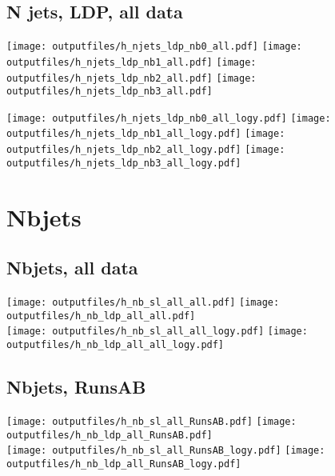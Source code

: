 \documentclass[11pt]{article}
\begin{document}
   \clearpage

    \subsection{ N jets, LDP, all data}

    \noindent
     \texttt{[image: outputfiles/h\_njets\_ldp\_nb0\_all.pdf]}
     \texttt{[image: outputfiles/h\_njets\_ldp\_nb1\_all.pdf]}
     \texttt{[image: outputfiles/h\_njets\_ldp\_nb2\_all.pdf]}
     \texttt{[image: outputfiles/h\_njets\_ldp\_nb3\_all.pdf]}

    \noindent
     \texttt{[image: outputfiles/h\_njets\_ldp\_nb0\_all\_logy.pdf]}
     \texttt{[image: outputfiles/h\_njets\_ldp\_nb1\_all\_logy.pdf]}
     \texttt{[image: outputfiles/h\_njets\_ldp\_nb2\_all\_logy.pdf]}
     \texttt{[image: outputfiles/h\_njets\_ldp\_nb3\_all\_logy.pdf]}

   \clearpage




    \clearpage
    \section{Nbjets}

    \subsection{ Nbjets, all data}

    \noindent
     \texttt{[image: outputfiles/h\_nb\_sl\_all\_all.pdf]}
     \texttt{[image: outputfiles/h\_nb\_ldp\_all\_all.pdf]} \\
     \texttt{[image: outputfiles/h\_nb\_sl\_all\_all\_logy.pdf]}
     \texttt{[image: outputfiles/h\_nb\_ldp\_all\_all\_logy.pdf]}


    \subsection{ Nbjets, RunsAB}

    \noindent
     \texttt{[image: outputfiles/h\_nb\_sl\_all\_RunsAB.pdf]}
     \texttt{[image: outputfiles/h\_nb\_ldp\_all\_RunsAB.pdf]} \\
     \texttt{[image: outputfiles/h\_nb\_sl\_all\_RunsAB\_logy.pdf]}
     \texttt{[image: outputfiles/h\_nb\_ldp\_all\_RunsAB\_logy.pdf]}
\end{document}
